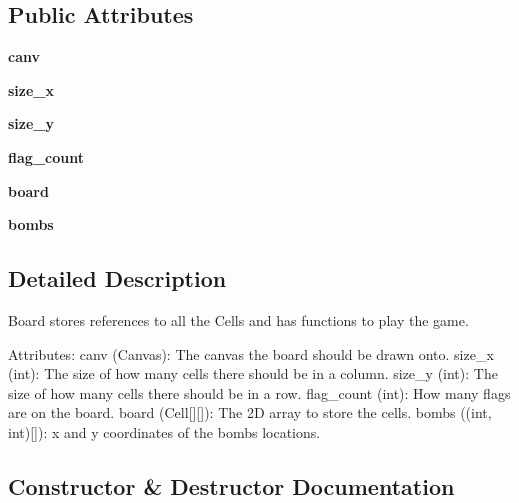 \subsection*{Public Attributes}
\begin{DoxyCompactItemize}
\item 
\mbox{\label{class_minesweeper_1_1_board_a366959f32b8b98e5140a35371f9154ad}} 
{\bfseries canv}
\item 
\mbox{\label{class_minesweeper_1_1_board_ad34610f9c6be24a38171a29d227065c2}} 
{\bfseries size\+\_\+x}
\item 
\mbox{\label{class_minesweeper_1_1_board_ab322dcad199a0b8801d2eb89aa20713c}} 
{\bfseries size\+\_\+y}
\item 
\mbox{\label{class_minesweeper_1_1_board_a387d7a42ca49ea81745093f11a5cc092}} 
{\bfseries flag\+\_\+count}
\item 
\mbox{\label{class_minesweeper_1_1_board_aa75e13e4bd8f70112dfff5dd9863ca77}} 
{\bfseries board}
\item 
\mbox{\label{class_minesweeper_1_1_board_a84a33014cde1e1fbc00f3e9106c011f8}} 
{\bfseries bombs}
\end{DoxyCompactItemize}


\subsection{Detailed Description}
\begin{DoxyVerb}Board stores references to all the Cells and has functions to play the game.

   Attributes:
   canv (Canvas): The canvas the board should be drawn onto.
   size_x (int): The size of how many cells there should be in a column.
   size_y (int): The size of how many cells there should be in a row.
   flag_count (int): How many flags are on the board.
   board (Cell[][]): The 2D array to store the cells.
   bombs ((int, int)[]): x and y coordinates of the bombs locations.\end{DoxyVerb}
 

\subsection{Constructor \& Destructor Documentation}
\mbox{\label{class_minesweeper_1_1_board_a73f4db1b86dab753125ed0a6ca232667}} 
